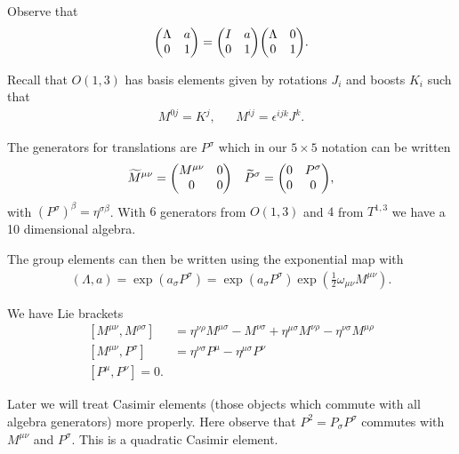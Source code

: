 \begin{note}
    Observe that
    \begin{align}
        \mqty( \Lambda & a \\ 0 & 1 ) = \mqty( I & a \\ 0 & 1) \mqty( \Lambda & 0 \\ 0 & 1)
    .\end{align}
\end{note}

Recall that $O \left( 1,3 \right) $ has basis elements given by rotations $J_{i}$ and boosts $K_{i}$ such that
\begin{align}
    M^{0j} = K^{j}, && M^{ij} = \epsilon^{ijk} J^{k}
.\end{align}

The generators for translations are $P^{\sigma}$ which in our $5 \times 5$ notation can be written
\begin{align}
    \widetilde{M}^{\mu \nu} = \mqty( M^{\mu \nu} & 0 \\ 0 & 0 ) && \widetilde{P}^{\sigma} = \mqty( 0 & P^{\sigma} \\ 0 & 0 )
,\end{align}
with $\left( P^{\sigma} \right)^{\beta} = \eta^{\sigma \beta}$. With $6$ generators from $O \left( 1,3 \right) $ and $4$ from $T^{1,3}$ we have a 10 dimensional algebra.

The group elements can then be written using the exponential map with
\begin{align}
    \left( \Lambda, a \right) = \exp \left( a_\sigma P^{\sigma} \right) = \exp \left( a_\sigma P^{\sigma} \right) \exp \left( \frac{1}{2} \omega_{\mu \nu} M^{\mu \nu} \right) 
.\end{align}

We have Lie brackets
\begin{align}
    \left[ M^{\mu \nu}, M^{\rho \sigma} \right]  &= \eta^{\nu \rho} M^{\mu \sigma} - M^{\nu \sigma} + \eta^{\mu \sigma} M^{\nu \rho} - \eta^{\nu \sigma} M^{\mu \rho} \\
    \left[ M^{\mu \nu}, P^{\sigma} \right] &= \eta^{\nu \sigma} P^{\mu} - \eta^{\mu \sigma} P^{\nu} \\
    \left[ P^{\mu}, P^{\nu} \right] = 0
.\end{align}

Later we will treat Casimir elements (those objects which commute with all algebra generators) more properly. Here observe that $P^2 = P_\sigma P^{\sigma}$ commutes with $M^{\mu \nu}$ and $P^{\sigma}$. This is a quadratic Casimir element.

